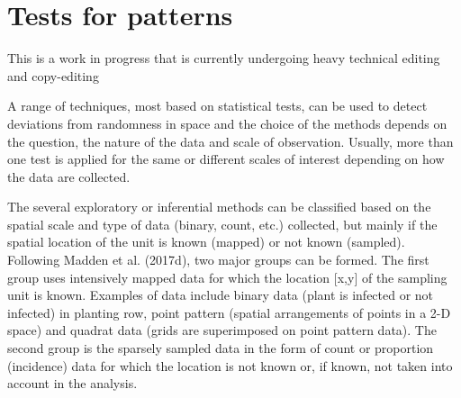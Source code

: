 \documentclass[
  letterpaper,
  DIV=11,
  numbers=noendperiod]{scrreprt}
\begin{document}
\hypertarget{tests-for-patterns}{%
\chapter{Tests for patterns}\label{tests-for-patterns}}

\begin{tcolorbox}[enhanced jigsaw, breakable, left=2mm, opacityback=0, rightrule=.15mm, toprule=.15mm, colframe=quarto-callout-note-color-frame, arc=.35mm, colback=white, bottomrule=.15mm, leftrule=.75mm]
\begin{minipage}[t]{5.5mm}
\textcolor{quarto-callout-note-color}{\faInfo}
\end{minipage}%
\begin{minipage}[t]{\textwidth - 5.5mm}

This is a work in progress that is currently undergoing heavy technical
editing and copy-editing

\end{minipage}%
\end{tcolorbox}

A range of techniques, most based on statistical tests, can be used to
detect deviations from randomness in space and the choice of the methods
depends on the question, the nature of the data and scale of
observation. Usually, more than one test is applied for the same or
different scales of interest depending on how the data are collected.

The several exploratory or inferential methods can be classified based
on the spatial scale and type of data (binary, count, etc.) collected,
but mainly if the spatial location of the unit is known (mapped) or not
known (sampled). Following Madden et al. (2017d), two major groups can
be formed. The first group uses intensively mapped data for which the
location {[}x,y{]} of the sampling unit is known. Examples of data
include binary data (plant is infected or not infected) in planting row,
point pattern (spatial arrangements of points in a 2-D space) and
quadrat data (grids are superimposed on point pattern data). The second
group is the sparsely sampled data in the form of count or proportion
(incidence) data for which the location is not known or, if known, not
taken into account in the analysis.
\end{document}
